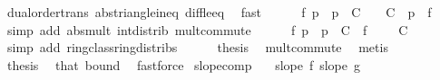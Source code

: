 \begin{isabellebody}
\ dual{\isacharunderscore}{\kern0pt}order{\isachardot}{\kern0pt}trans\ abs{\isacharunderscore}{\kern0pt}triangle{\isacharunderscore}{\kern0pt}ineq{}\ diff{\isacharunderscore}{\kern0pt}le{\isacharunderscore}{\kern0pt}eq\ \isamarkupfalse%
\ fast\isanewline
\ \ \ \ \isamarkupfalse%
\ {\isachardoublequoteopen}{\isasymbar}f\ p{\isasymbar}\ {\isasymle}\ {\isasymbar}p{\isasymbar}\ {\isacharasterisk}{\kern0pt}\ C\ {\isacharplus}{\kern0pt}\ {}\ {\isacharasterisk}{\kern0pt}\ C\ {\isacharplus}{\kern0pt}\ {\isasymbar}p{\isasymbar}\ {\isacharasterisk}{\kern0pt}\ {\isasymbar}f\ {}{\isasymbar}{\isachardoublequoteclose}\ \isamarkupfalse%
\ {\isacharparenleft}{\kern0pt}simp\ add{\isacharcolon}{\kern0pt}\ abs{\isacharunderscore}{\kern0pt}mult\ int{\isacharunderscore}{\kern0pt}distrib{\isacharparenleft}{\kern0pt}{}{\isacharparenright}{\kern0pt}\ mult{\isachardot}{\kern0pt}commute{\isacharparenright}{\kern0pt}\isanewline
\ \ \ \ \isamarkupfalse%
\ {\isachardoublequoteopen}{\isasymbar}f\ p{\isasymbar}\ {\isasymle}\ {\isasymbar}p{\isasymbar}\ {\isacharasterisk}{\kern0pt}\ {\isacharparenleft}{\kern0pt}C\ {\isacharplus}{\kern0pt}\ {\isasymbar}f\ {}{\isasymbar}{\isacharparenright}{\kern0pt}\ {\isacharplus}{\kern0pt}\ {}\ {\isacharasterisk}{\kern0pt}\ C{\isachardoublequoteclose}\ \isamarkupfalse%
\ {\isacharparenleft}{\kern0pt}simp\ add{\isacharcolon}{\kern0pt}\ ring{\isacharunderscore}{\kern0pt}class{\isachardot}{\kern0pt}ring{\isacharunderscore}{\kern0pt}distribs{\isacharparenleft}{\kern0pt}{}{\isacharparenright}{\kern0pt}{\isacharparenright}{\kern0pt}\isanewline
\ \ \ \ \isamarkupfalse%
\ {\isacharquery}{\kern0pt}thesis\ \isamarkupfalse%
\ mult{\isachardot}{\kern0pt}commute\ \isamarkupfalse%
\ metis\isanewline
\ \ \isamarkupfalse%
\isanewline
\ \ \isamarkupfalse%
\ {\isacharquery}{\kern0pt}thesis\ \isamarkupfalse%
\ that\ bound{\isacharparenleft}{\kern0pt}{}{\isacharparenright}{\kern0pt}\ \isamarkupfalse%
\ fastforce\isanewline
{}\isamarkupfalse%
%
\endisatagproof
{\isafoldproof}%
%
\isadelimproof
\isanewline
%
\endisadelimproof
\isanewline
{}\isamarkupfalse%
\ slope{\isacharunderscore}{\kern0pt}comp{\isacharcolon}{\kern0pt}\isanewline
\ \ \ {\isachardoublequoteopen}slope\ f{\isachardoublequoteclose}\ {\isachardoublequoteopen}slope\ g{\isachardoublequoteclose}\isanewline

\end{isabellebody}

